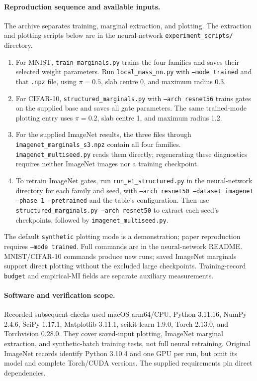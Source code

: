 \documentclass[11pt,a4paper]{article}
\theoremstyle{compactplain}
\theoremstyle{compactdefinition}
\numberwithin{equation}{section}
\begin{document}
\paragraph{Reproduction sequence and available inputs.}
The archive separates training, marginal extraction, and plotting. The
extraction and plotting scripts below are in the neural-network
\texttt{experiment\_scripts/} directory.
\begin{enumerate}[leftmargin=*,itemsep=2pt]
\item For MNIST, \texttt{train\_marginals.py} trains the four families
and saves their selected weight parameters. Run
\texttt{local\_mass\_nn.py} with \texttt{--mode trained} and that
\texttt{.npz} file, using \(\pi=0.5\), slab centre 0, and maximum
radius 0.3.
\item For CIFAR-10, \texttt{structured\_marginals.py} with
\texttt{--arch resnet56} trains gates on the supplied base and saves
all gate parameters. The same trained-mode plotting entry uses
\(\pi=0.2\), slab centre 1, and maximum radius 1.2.
\item For the supplied ImageNet results, the three files
 through
\texttt{imagenet\_marginals\_s3.npz} contain all four families.
\texttt{imagenet\_multiseed.py} reads them directly; regenerating these
diagnostics requires neither ImageNet images nor a training checkpoint.
\item To retrain ImageNet gates, run \texttt{run\_e1\_structured.py}
in the neural-network directory for each family and seed, with
\texttt{--arch resnet50 --dataset imagenet --phase 1 --pretrained}
and the table's configuration. Then use
\texttt{structured\_marginals.py --arch resnet50} to extract each
seed's checkpoints, followed by \texttt{imagenet\_multiseed.py}.
\end{enumerate}
The default \texttt{synthetic} plotting mode is a demonstration;
paper reproduction requires \texttt{--mode trained}. Full commands
are in the neural-network README. MNIST/CIFAR-10 commands produce new
runs; saved ImageNet marginals support direct plotting without the
excluded large checkpoints. Training-record \texttt{budget} and
empirical-MI fields are separate auxiliary measurements.

\paragraph{Software and verification scope.}
Recorded subsequent checks used macOS arm64/CPU, Python 3.11.16,
NumPy 2.4.6, SciPy 1.17.1, Matplotlib 3.11.1, scikit-learn 1.9.0,
Torch 2.13.0, and Torchvision 0.28.0. They cover saved-input plotting,
ImageNet marginal extraction, and synthetic-batch training tests,
not full neural retraining. Original ImageNet records identify
Python 3.10.4 and one GPU per run, but omit its model and complete
Torch/CUDA versions. The supplied requirements pin direct dependencies.
\end{document}
